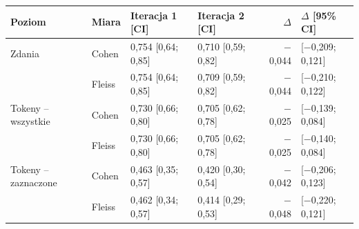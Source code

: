 \begin{tabular}{llllrl}
\toprule
Poziom & Miara & Iteracja 1 [CI] & Iteracja 2 [CI] & $\Delta$ & $\Delta$ [95\% CI] \\
\midrule
Zdania & Cohen & 0{,}754 [0{,}64; 0{,}85] & 0{,}710 [0{,}59; 0{,}82] & $-$0{,}044 & [$-$0{,}209; 0{,}121] \\
 & Fleiss & 0{,}754 [0{,}64; 0{,}85] & 0{,}709 [0{,}59; 0{,}82] & $-$0{,}044 & [$-$0{,}210; 0{,}122] \\
\midrule
Tokeny -- wszystkie & Cohen & 0{,}730 [0{,}66; 0{,}80] & 0{,}705 [0{,}62; 0{,}78] & $-$0{,}025 & [$-$0{,}139; 0{,}084] \\
 & Fleiss & 0{,}730 [0{,}66; 0{,}80] & 0{,}705 [0{,}62; 0{,}78] & $-$0{,}025 & [$-$0{,}140; 0{,}084] \\
\midrule
Tokeny -- zaznaczone & Cohen & 0{,}463 [0{,}35; 0{,}57] & 0{,}420 [0{,}30; 0{,}54] & $-$0{,}042 & [$-$0{,}206; 0{,}123] \\
 & Fleiss & 0{,}462 [0{,}34; 0{,}57] & 0{,}414 [0{,}29; 0{,}53] & $-$0{,}048 & [$-$0{,}220; 0{,}121] \\
\bottomrule
\end{tabular}
